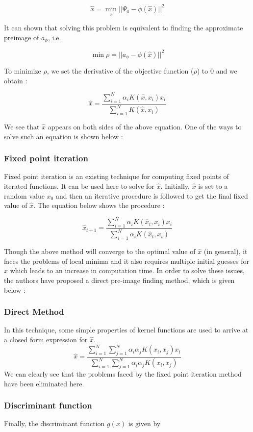 \documentclass{article} %
\begin{document}
\[ \hat{x} = \min_{\hat{x}} ||\Psi_a - \phi(\hat{x}) ||^2   \]

It can shown that solving this problem is equivalent to finding the approximate preimage of $a_\phi$, i.e.

\[ \min \rho = ||a_\phi - \phi(\hat{x}) ||^2 \]


To minimize $\rho$, we set the derivative of the objective function ($\rho$) to 0 and we obtain : 

\[ \hat{x} = \frac{\sum\limits_{i=1}^N \alpha_i K(\hat{x},x_i)x_i}{\sum\limits_{i=1}^N K(\hat{x},x_i)} \]

We see that $\hat{x}$ appears on both sides of the above equation. One of the ways to solve such an equation is shown below :
\subsubsection*{Fixed point iteration}

Fixed point iteration is an existing technique for computing fixed points of iterated functions.
It can be used here to solve for $\hat{x}$. Initially, $\hat{x}$ is set to a random value $x_0$ and then an iterative procedure is followed to get the final fixed value of $\hat{x}$. The equation below shows the procedure :

\[ \hat{x}_{t+1} = \frac{\sum\limits_{i=1}^N  \alpha_i  K(\hat{x}_t,x_i) x_i}{\sum\limits_{i=1}^N  \alpha_i K(\hat{x}_t,x_i)} \]

Though the above method will converge to the optimal value of $\hat{x}$ (in general), it faces the problems of local minima and it also requires multiple initial guesses for $\hat{x}$ which leads to an increase in computation time. In order to solve these issues, the authors have proposed a direct pre-image finding method, which is given below :


\subsubsection*{Direct Method} 

In this technique, some simple properties of kernel functions are used to arrive at a closed form expression for $\hat{x}$.
\[ \hat{x} = \frac{\sum\limits_{i=1}^N \sum\limits_{j=1}^N \alpha_i \alpha_j K(x_i,x_j) x_i}{\sum\limits_{i=1}^N \sum\limits_{j=1}^N \alpha_i \alpha_j K(x_i,x_j)} \]
We can clearly see that the problems faced by the fixed point iteration method have been eliminated here.	

\subsubsection{Discriminant function}
Finally, the discriminant function $g(x)$ is given by 
\end{document}

